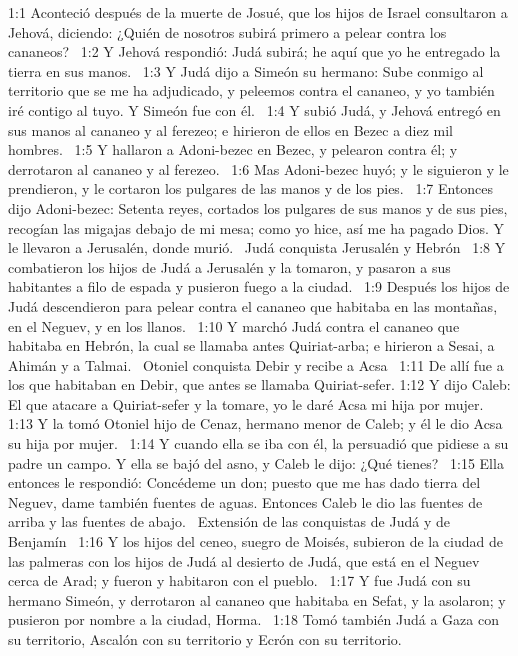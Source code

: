 1:1 Aconteció después de la muerte de Josué, que los hijos de Israel consultaron a Jehová, diciendo: ¿Quién de nosotros subirá primero a pelear contra los cananeos?  
1:2 Y Jehová respondió: Judá subirá; he aquí que yo he entregado la tierra en sus manos.  
1:3 Y Judá dijo a Simeón su hermano: Sube conmigo al territorio que se me ha adjudicado, y peleemos contra el cananeo, y yo también iré contigo al tuyo. Y Simeón fue con él.  
1:4 Y subió Judá, y Jehová entregó en sus manos al cananeo y al ferezeo; e hirieron de ellos en Bezec a diez mil hombres.  
1:5 Y hallaron a Adoni-bezec en Bezec, y pelearon contra él; y derrotaron al cananeo y al ferezeo.  
1:6 Mas Adoni-bezec huyó; y le siguieron y le prendieron, y le cortaron los pulgares de las manos y de los pies.  
1:7 Entonces dijo Adoni-bezec: Setenta reyes, cortados los pulgares de sus manos y de sus pies, recogían las migajas debajo de mi mesa; como yo hice, así me ha pagado Dios. Y le llevaron a Jerusalén, donde murió.  
Judá conquista Jerusalén y Hebrón  
1:8 Y combatieron los hijos de Judá a Jerusalén y la tomaron, y pasaron a sus habitantes a filo de espada y pusieron fuego a la ciudad.  
1:9 Después los hijos de Judá descendieron para pelear contra el cananeo que habitaba en las montañas, en el Neguev, y en los llanos.  
1:10 Y marchó Judá contra el cananeo que habitaba en Hebrón, la cual se llamaba antes Quiriat-arba; e hirieron a Sesai, a Ahimán y a Talmai.  
Otoniel conquista Debir y recibe a Acsa   
1:11 De allí fue a los que habitaban en Debir, que antes se llamaba Quiriat-sefer. 
1:12 Y dijo Caleb: El que atacare a Quiriat-sefer y la tomare, yo le daré Acsa mi hija por mujer.  
1:13 Y la tomó Otoniel hijo de Cenaz, hermano menor de Caleb; y él le dio Acsa su hija por mujer.  
1:14 Y cuando ella se iba con él, la persuadió que pidiese a su padre un campo. Y ella se bajó del asno, y Caleb le dijo: ¿Qué tienes?  
1:15 Ella entonces le respondió: Concédeme un don; puesto que me has dado tierra del Neguev, dame también fuentes de aguas. Entonces Caleb le dio las fuentes de arriba y las fuentes de abajo.  
Extensión de las conquistas de Judá y de Benjamín  
1:16 Y los hijos del ceneo, suegro de Moisés, subieron de la ciudad de las palmeras con los hijos de Judá al desierto de Judá, que está en el Neguev cerca de Arad; y fueron y habitaron con el pueblo.  
1:17 Y fue Judá con su hermano Simeón, y derrotaron al cananeo que habitaba en Sefat, y la asolaron; y pusieron por nombre a la ciudad, Horma.  
1:18 Tomó también Judá a Gaza con su territorio, Ascalón con su territorio y Ecrón con su territorio.  
